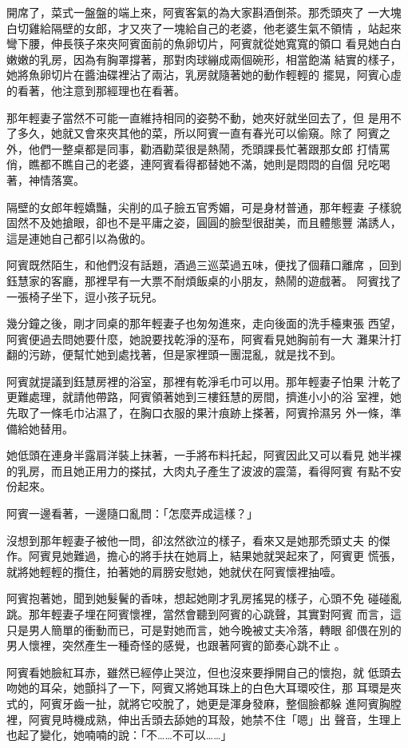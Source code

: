 開席了，菜式一盤盤的端上來，阿賓客氣的為大家斟酒倒茶。那禿頭夾了
一大塊白切雞給隔壁的女郎，才又夾了一塊給自己的老婆，他老婆生氣不領情
，站起來彎下腰，伸長筷子來夾阿賓面前的魚卵切片，阿賓就從她寬寬的領口
看見她白白嫩嫩的乳房，因為有胸罩撐著，那對肉球繃成兩個碗形，相當飽滿
結實的樣子，她將魚卵切片在醬油碟裡沾了兩沾，乳房就隨著她的動作輕輕的
擺晃，阿賓心虛的看著，他注意到那經理也在看著。

那年輕妻子當然不可能一直維持相同的姿勢不動，她夾好就坐回去了，但
是用不了多久，她就又會來夾其他的菜，所以阿賓一直有春光可以偷窺。除了
阿賓之外，他們一整桌都是同事，勸酒勸菜很是熱鬧，禿頭課長忙著跟那女郎
打情罵俏，瞧都不瞧自己的老婆，連阿賓看得都替她不滿，她則是悶悶的自個
兒吃喝著，神情落寞。

隔壁的女郎年輕嬌豔，尖削的瓜子臉五官秀媚，可是身材普通，那年輕妻
子樣貌固然不及她搶眼，卻也不是平庸之姿，圓圓的臉型很甜美，而且體態豐
滿誘人，這是連她自己都引以為傲的。

阿賓既然陌生，和他們沒有話題，酒過三巡菜過五味，便找了個藉口離席
，回到鈺慧家的客廳，那裡早有一大票不耐煩飯桌的小朋友，熱鬧的遊戲著。
阿賓找了一張椅子坐下，逗小孩子玩兒。

幾分鐘之後，剛才同桌的那年輕妻子也匆匆進來，走向後面的洗手檯東張
西望，阿賓便過去問她要什麼，她說要找乾淨的溼布，阿賓看見她胸前有一大
灘果汁打翻的污跡，便幫忙她到處找著，但是家裡頭一團混亂，就是找不到。

阿賓就提議到鈺慧房裡的浴室，那裡有乾淨毛巾可以用。那年輕妻子怕果
汁乾了更難處理，就請他帶路，阿賓領著她到三樓鈺慧的房間，擠進小小的浴
室裡，她先取了一條毛巾沾濕了，在胸口衣服的果汁痕跡上搽著，阿賓拎濕另
外一條，準備給她替用。

她低頭在連身半露肩洋裝上抹著，一手將布料托起，阿賓因此又可以看見
她半裸的乳房，而且她正用力的搽拭，大肉丸子產生了波波的震蕩，看得阿賓
有點不安份起來。

阿賓一邊看著，一邊隨口亂問：「怎麼弄成這樣？」

沒想到那年輕妻子被他一問，卻泫然欲泣的樣子，看來又是她那禿頭丈夫
的傑作。阿賓見她難過，擔心的將手扶在她肩上，結果她就哭起來了，阿賓更
慌張，就將她輕輕的攬住，拍著她的肩膀安慰她，她就伏在阿賓懷裡抽噎。

阿賓抱著她，聞到她髮鬢的香味，想起她剛才乳房搖晃的樣子，心頭不免
碰碰亂跳。那年輕妻子埋在阿賓懷裡，當然會聽到阿賓的心跳聲，其實對阿賓
而言，這只是男人簡單的衝動而已，可是對她而言，她今晚被丈夫冷落，轉眼
卻偎在別的男人懷裡，突然產生一種奇怪的感覺，也跟著阿賓的節奏心跳不止
。

阿賓看她臉紅耳赤，雖然已經停止哭泣，但也沒來要掙開自己的懷抱，就
低頭去吻她的耳朵，她顫抖了一下，阿賓又將她耳珠上的白色大耳環咬住，那
耳環是夾式的，阿賓牙齒一扯，就將它咬脫了，她更是渾身發麻，整個臉都躲
進阿賓胸膛裡，阿賓見時機成熟，伸出舌頭去舔她的耳殼，她禁不住「嗯」出
聲音，生理上也起了變化，她喃喃的說：「不……不可以……」

